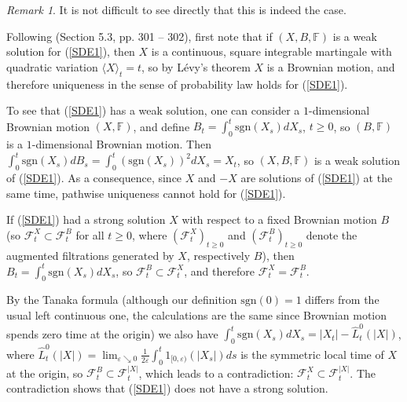 \documentclass[reqno]{amsart}
\theoremstyle{definition}
\theoremstyle{remark}
\newtheorem{remark}[theorem]{Remark}
\numberwithin{equation}{section}
\begin{document}
\begin{remark}
It is not difficult to see directly that this is indeed the case.

Following \cite{Karatzas-Shreve} (Section 5.3, pp. 301 -- 302), first note that if $\left( X,B,\mathbb{F}\right) $ is a weak solution for (\ref{SDE1}), then $X$ is a
continuous, square integrable martingale with quadratic variation $\langle
X\rangle _{t}=t$, so by L\'{e}vy's theorem $X$ is a Brownian motion, and
therefore uniqueness in the sense of probability law holds for (\ref{SDE1}).

To see that (\ref{SDE1}) has a weak solution, one can consider a $1$-dimensional
Brownian motion $\left( X, \mathbb{F}\right)$, and define $B_{t}=\int_{0}^{t}\mathrm{sgn}\left(
X_{s}\right) dX_{s}$, $t\ge 0$, so $\left(B, \mathbb{F}\right)$ is a $1$-dimensional Brownian motion. Then $\int_{0}^{t}\mathrm{sgn}\left( X_{s}\right) dB_{s}=\int_{0}^{t}\left(
\mathrm{sgn}\left( X_{s}\right) \right) ^{2}dX_{s}=X_{t}$, so $\left(
X,B,\mathbb{F}\right)$ is a weak solution of (\ref{SDE1}). As a consequence, since $X$ and $-X$ are solutions of (\ref{SDE1}) at the same time,
pathwise uniqueness cannot hold for (\ref{SDE1}).

If (\ref{SDE1}) had a strong solution $X$ with respect to a fixed Brownian motion $B$ (so $\mathcal{F}_{t}^{X}\subset \mathcal{F}_{t}^{B}$ for all $t\geq 0$, where $\left(\mathcal{F}_t^X\right)_{t\ge 0}$ and $\left(\mathcal{F}_t^B\right)_{t \ge 0}$ denote the augmented filtrations generated by $X$, respectively $B$), then $B_{t}=\int_{0}^{t}\mathrm{sgn}\left(
X_{s}\right) dX_{s}$, so $\mathcal{F}_{t}^{B}\subset \mathcal{F}_{t}^{X}$,
and therefore $\mathcal{F}_{t}^{X}=\mathcal{F}_{t}^{B}$.

By the Tanaka formula (although our definition $\mathrm{sgn}(0)=1$ differs from the usual left continuous one, the calculations are the same since Brownian motion spends zero time at the origin) we also have $\int_{0}^{t}\mathrm{sgn}\left( X_{s}\right)
dX_{s}=\left\vert X_{t}\right\vert -\widehat{L}_{t}^{0}(\vert X\vert)$, where $\widehat{L}_t^0(\vert X\vert)=\lim_{\varepsilon \searrow 0} \frac{1}{2\varepsilon} \int_0^t 1_{[0, \varepsilon)}(\vert X_s\vert) ds$ is the symmetric local time
of $X$ at the origin, so $\mathcal{F}_{t}^{B}\subset \mathcal{F}_{t}^{\left\vert X\right\vert }$, which leads to a contradiction: $\mathcal{F}_{t}^{X}\subset \mathcal{F}_{t}^{\left\vert X\right\vert }$. The
contradiction shows that (\ref{SDE1}) does not have a strong solution.
\end{remark}
\end{document}
